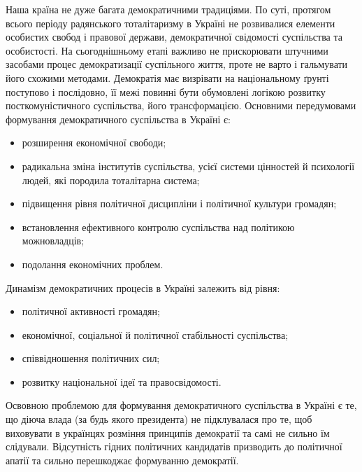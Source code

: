 Наша країна не дуже багата демократичними традиціями. По суті, протягом всього періоду радянського тоталітаризму в Україні не розвивалися елементи особистих свобод і правової держави, демократичної свідомості суспільства та особистості. На сьогоднішньому етапі важливо не прискорювати штучними засобами процес демократизації суспільного життя, проте не варто і гальмувати його схожими методами. Демократія має визрівати на національному ґрунті поступово і послідовно, її межі повинні бути обумовлені логікою розвитку посткомуністичного суспільства, його трансформацією.
Основними передумовами формування демократичного суспільства в Україні є:
\begin{itemize}
\item розширення економічної свободи;
\item радикальна зміна інститутів суспільства, усієї системи цінностей й психології людей, які породила тоталітарна система;
\item підвищення рівня політичної дисципліни і політичної культури громадян;
\item встановлення ефективного контролю суспільства над політикою можновладців;
\item подолання економічних проблем.
\end{itemize}
Динамізм демократичних процесів в Україні залежить від рівня:
\begin{itemize}
\item політичної активності громадян;
\item економічної, соціальної й політичної стабільності суспільства;
\item співвідношення політичних сил;
\item розвитку національної ідеї та правосвідомості.
\end{itemize}
Освовною проблемою для формування демократичного суспільства в Україні є те, що діюча влада (за будь якого президента) не підклувалася про те, щоб виховувати в українцях розміння принципів демократії та самі не сильно їм слідували. Відсутність гідних політичних кандидатів призводить до політичної апатії та сильно перешкоджає формуванню демократії. 
